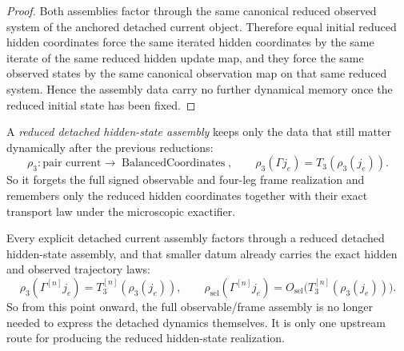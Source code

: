 \begin{proof}
Both assemblies factor through the same canonical reduced observed system of
the anchored detached current object. Therefore equal initial reduced hidden
coordinates force the same iterated hidden coordinates by the same iterate of
the same reduced hidden update map, and they force the same observed states by
the same canonical observation map on that same reduced system. Hence the
assembly data carry no further dynamical memory once the reduced initial state
has been fixed.
\end{proof}

\begin{definition}
\label{def:reduced-detached-hidden-state-assembly}
A \emph{reduced detached hidden-state assembly} keeps only the data that still
matter dynamically after the previous reductions:
\[
\rho_3 :
\text{pair current}\to \operatorname{BalancedCoordinates},
\qquad
\rho_3(\Gamma j_e)=T_3(\rho_3(j_e)).
\]
So it forgets the full signed observable and four-leg frame realization and
remembers only the reduced hidden coordinates together with their exact
transport law under the microscopic exactifier.
\end{definition}

\begin{corollary}
\label{thm:the-reduced-detached-hidden-state-assembly-already-carries-the-detached-dynamics}
Every explicit detached current assembly factors through a reduced detached
hidden-state assembly, and that smaller datum already carries the exact
hidden and observed trajectory laws:
\[
\rho_3(\Gamma^{[n]} j_e)=T_3^{[n]}(\rho_3(j_e)),
\qquad
\rho_{\mathrm{sel}}(\Gamma^{[n]} j_e)=
O_{\mathrm{sel}}\!\bigl(T_3^{[n]}(\rho_3(j_e))\bigr).
\]
So from this point onward, the full observable/frame assembly is no longer needed
to express the detached dynamics themselves. It is only one upstream route for
producing the reduced hidden-state realization.
\end{corollary}

